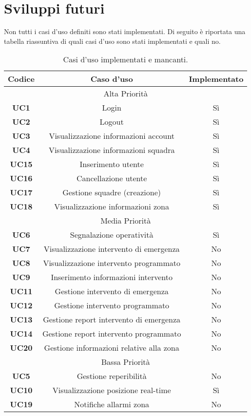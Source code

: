 \section{Sviluppi futuri}
Non tutti i casi d'uso definiti sono stati implementati. Di seguito è riportata una tabella riassuntiva di quali casi d'uso sono stati implementati e quali no.

\begin{table}[h!]
	\centering
	\begin{tabular}{|c|c|c|}
		\hline
		\textbf{Codice} & \textbf{Caso d'uso} & \textbf{Implementato} \\ \hline
		\multicolumn{3}{|c|}{Alta Priorità} \\ \hline
		\textbf{UC1} & Login & Sì\\ \hline
		\textbf{UC2} & Logout & Sì \\ \hline
		\textbf{UC3} & Visualizzazione informazioni account & Sì \\ \hline
		\textbf{UC4} & Visualizzazione informazioni squadra & Sì \\ \hline
		\textbf{UC15} & Inserimento utente & Sì \\ \hline
		\textbf{UC16} & Cancellazione utente & Sì\\ \hline
		\textbf{UC17} & Gestione squadre (creazione) & Sì \\ \hline
		\textbf{UC18} & Visualizzazione informazioni zona & Sì \\ \hline
		\multicolumn{3}{|c|}{Media Priorità} \\ \hline
		\textbf{UC6} & Segnalazione operatività & Sì\\ \hline
		\textbf{UC7} & Visualizzazione intervento di emergenza & No \\ \hline
		\textbf{UC8} & Visualizzazione intervento programmato & No \\ \hline
		\textbf{UC9} & Inserimento informazioni intervento & No \\ \hline
		\textbf{UC11} & Gestione intervento di emergenza & No \\ \hline
		\textbf{UC12} & Gestione intervento programmato & No \\ \hline
		\textbf{UC13} & Gestione report intervento di emergenza & No \\ \hline
		\textbf{UC14} & Gestione report intervento programmato & No \\ \hline
		\textbf{UC20} & Gestione informazioni relative alla zona & No \\ \hline
		\multicolumn{3}{|c|}{Bassa Priorità} \\ \hline
		\textbf{UC5} & Gestione reperibilità & No\\ \hline
		\textbf{UC10} & Visualizzazione posizione real-time & Sì\\ \hline
		\textbf{UC19} & Notifiche allarmi zona & No\\ \hline
	\end{tabular}
	\caption{\label{tab:table-name}Casi d'uso implementati e mancanti.}
\end{table}


